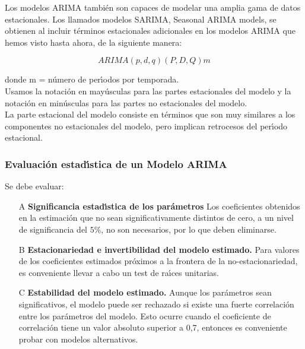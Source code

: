 Los modelos ARIMA tambi\'en son capaces de modelar una amplia gama de datos estacionales. Los llamados  modelos SARIMA, Seasonal ARIMA models, se obtienen al incluir t\'erminos estacionales adicionales en los modelos ARIMA que hemos visto hasta ahora, de la siguiente manera:

\begin{equation}
ARIMA (p,d,q)(P,D,Q)m
\end{equation}

donde m = n\'umero de per\'{\i}odos por temporada. \\
Usamos la notaci\'on en may\'usculas para las partes estacionales del modelo y la notaci\'on en min\'usculas para las partes no estacionales del modelo.\\
La parte estacional del modelo consiste en t\'erminos que son muy similares a los componentes no estacionales del modelo, pero implican retrocesos del per\'{\i}odo estacional. \\

\subsubsection[evaluación]{Evaluaci\'on estad\'{\i}stica de un Modelo ARIMA}
Se debe evaluar:
\begin{itemize}
\item[A] \textbf{Significancia estad\'{\i}stica de los par\'ametros} 
Los coeficientes obtenidos en la estimaci\'on que no sean significativamente distintos de cero, a un nivel de significancia del $5\%$, no son necesarios, por lo que deben eliminarse.
\item[B] \textbf{Estacionariedad e invertibilidad del modelo estimado.} Para valores de los coeficientes estimados pr\'oximos a la frontera de la no-estacionariedad, es conveniente llevar a cabo un test de ra\'{\i}ces unitarias.
\item[C] \textbf{Estabilidad del modelo estimado.} Aunque los par\'ametros sean significativos, el modelo puede ser rechazado si existe una fuerte correlaci\'on entre los par\'ametros del modelo. Esto ocurre cuando el coeficiente de correlaci\'on tiene un valor absoluto superior a 0,7, entonces es conveniente probar con modelos alternativos.
\end{itemize}

